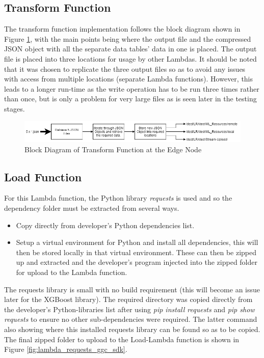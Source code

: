 \subsection{Transform Function}
\label{transform_fn_impl}
The transform function implementation follows the block diagram shown in Figure \ref{fig:lambda_transform_fn}, with the main points being where the output file and the compressed JSON object with all the separate data tables' data in one is placed. The output file is placed into three locations for usage by other Lambdas. It should be noted that it was chosen to replicate the three output files so as to avoid any issues with access from multiple locations (separate Lambda functions). However, this leads to a longer run-time as the write operation has to be run three times rather than once, but is only a problem for very large files as is seen later in the testing stages.

\begin{figure}[ht]
    \centering
    \includegraphics[width=1\linewidth]{pages/Chapter4/Chapter 4 Images/LambdaFns/transform-fn.png}
    \caption{Block Diagram of Transform Function at the Edge Node}
    \label{fig:lambda_transform_fn}
\end{figure}


\subsection{Load Function}
\label{load_fn_impl}
For this Lambda function, the Python library \textit{requests} is used and so the dependency folder must be extracted from several ways. 
\begin{itemize}
    \item Copy directly from developer's Python dependencies list.
    \item Setup a virtual environment for Python and install all dependencies, this will then be stored locally in that virtual environment. These can then be zipped up and extracted and the developer's program injected into the zipped folder for upload to the Lambda function.
\end{itemize}

The requests library is small with no build requirement (this will become an issue later for the XGBoost library). The required directory was copied directly from the developer's Python-libraries list after using \textit{pip install requests} and \textit{pip show requests} to ensure no other sub-dependencies were required. The latter command also showing where this installed requests library can be found so as to be copied. The final zipped folder to upload to the Load-Lambda function is shown in Figure \ref{fig:lambda_requests_ggc_sdk}.

